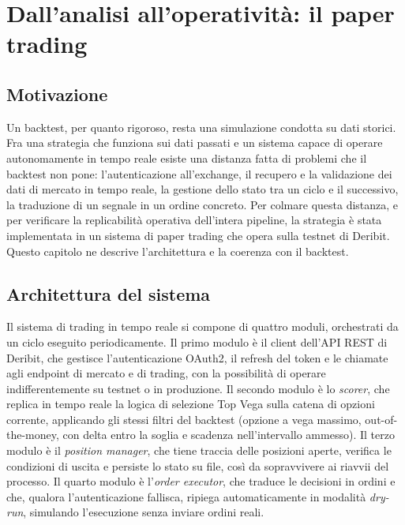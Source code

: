 \chapter{Dall'analisi all'operatività: il paper trading}
\label{ch:paper-trading}

\section{Motivazione}
\label{sec:live-motivazione}

Un backtest, per quanto rigoroso, resta una simulazione condotta su dati
storici. Fra una strategia che funziona sui dati passati e un sistema capace
di operare autonomamente in tempo reale esiste una distanza fatta di
problemi che il backtest non pone: l'autenticazione all'exchange, il recupero
e la validazione dei dati di mercato in tempo reale, la gestione dello stato
tra un ciclo e il successivo, la traduzione di un segnale in un ordine
concreto. Per colmare questa distanza, e per verificare la replicabilità
operativa dell'intera pipeline, la strategia è stata implementata in un
sistema di paper trading che opera sulla testnet di Deribit. Questo capitolo
ne descrive l'architettura e la coerenza con il backtest.

\section{Architettura del sistema}
\label{sec:live-architettura}

Il sistema di trading in tempo reale si compone di quattro moduli, orchestrati
da un ciclo eseguito periodicamente. Il primo modulo è il client
dell'API REST di Deribit, che gestisce l'autenticazione OAuth2, il refresh
del token e le chiamate agli endpoint di mercato e di trading, con la
possibilità di operare indifferentemente su testnet o in produzione. Il
secondo modulo è lo \emph{scorer}, che replica in tempo reale la logica di
selezione Top Vega sulla catena di opzioni corrente, applicando gli stessi
filtri del backtest (opzione a vega massimo, out-of-the-money, con delta
entro la soglia e scadenza nell'intervallo ammesso). Il terzo modulo è il
\emph{position manager}, che tiene traccia delle posizioni aperte, verifica
le condizioni di uscita e persiste lo stato su file, così da sopravvivere ai
riavvii del processo. Il quarto modulo è l'\emph{order executor}, che
traduce le decisioni in ordini e che, qualora l'autenticazione fallisca,
ripiega automaticamente in modalità \emph{dry-run}, simulando l'esecuzione
senza inviare ordini reali.

